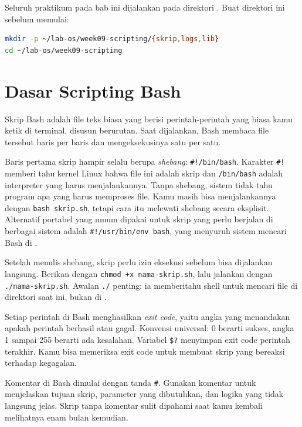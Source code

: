 \begin{notebox}
Seluruh praktikum pada bab ini dijalankan pada direktori
.
Buat direktori ini sebelum memulai:
\begin{lstlisting}[language=bash]
mkdir -p ~/lab-os/week09-scripting/{skrip,logs,lib}
cd ~/lab-os/week09-scripting
\end{lstlisting}
\end{notebox}

\section{Dasar Scripting Bash}
\label{sec:dasar-scripting-bash}

Skrip Bash adalah file teks biasa yang berisi perintah-perintah yang
biasa kamu ketik di terminal, disusun berurutan. Saat dijalankan, Bash
membaca file tersebut baris per baris dan mengeksekusinya satu per satu.

Baris pertama skrip hampir selalu berupa \textit{shebang}: \texttt{\#!/bin/bash}.
Karakter \texttt{\#!} memberi tahu kernel Linux bahwa file ini adalah
skrip dan \texttt{/bin/bash} adalah interpreter yang harus menjalankannya.
Tanpa shebang, sistem tidak tahu program apa yang harus memproses file.
Kamu masih bisa menjalankannya dengan \texttt{bash skrip.sh}, tetapi cara
itu melewati shebang secara eksplisit. Alternatif portabel yang umum
dipakai untuk skrip yang perlu berjalan di berbagai sistem adalah
\texttt{\#!/usr/bin/env bash}, yang menyuruh sistem mencari Bash di
.

Setelah menulis shebang, skrip perlu izin eksekusi sebelum bisa
dijalankan langsung. Berikan dengan \texttt{chmod +x nama-skrip.sh},
lalu jalankan dengan \texttt{./nama-skrip.sh}. Awalan \texttt{./} penting:
ia memberitahu shell untuk mencari file di direktori saat ini, bukan di
.

Setiap perintah di Bash menghasilkan \textit{exit code}, yaitu angka yang
menandakan apakah perintah berhasil atau gagal. Konvensi universal: 0
berarti sukses, angka 1 sampai 255 berarti ada kesalahan. Variabel
\texttt{\$?} menyimpan exit code perintah terakhir. Kamu bisa memeriksa
exit code untuk membuat skrip yang bereaksi terhadap kegagalan.

Komentar di Bash dimulai dengan tanda \texttt{\#}. Gunakan komentar untuk
menjelaskan tujuan skrip, parameter yang dibutuhkan, dan logika yang tidak
langsung jelas. Skrip tanpa komentar sulit dipahami saat kamu kembali
melihatnya enam bulan kemudian.

